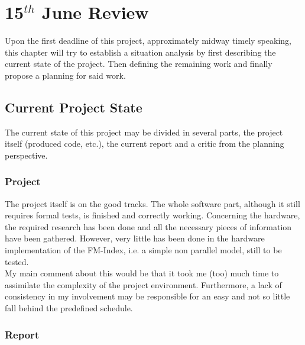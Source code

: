 
\chapter{15$^{th}$ June Review} %

\label{ChapterTemp} %

Upon the first deadline of this project, approximately midway timely speaking, this chapter will try to establish a situation analysis by first describing the current state of the project. Then defining the remaining work and finally propose a planning for said work.

\section{Current Project State}

The current state of this project may be divided in several parts, the project itself (produced code, etc.), the current report and a critic from the planning perspective.

\subsection{Project}

The project itself is on the good tracks. The whole software part, although it still requires formal tests, is finished and correctly working. Concerning the hardware, the required research has been done and all the necessary pieces of information have been gathered. However, very little has been done in the hardware implementation of the FM-Index, i.e. a simple non parallel model, still to be tested. \\

My main comment about this would be that it took me (too) much time to assimilate the complexity of the project environment. Furthermore, a lack of consistency in my involvement may be responsible for an easy and not so little fall behind the predefined schedule.

\subsection{Report}


